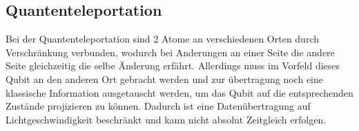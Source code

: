 \subsection{Quantenteleportation}
\label{sec:Quantenteleportation}

Bei der Quantenteleportation sind 2 Atome an verschiedenen Orten durch Verschränkung verbunden, wodurch bei Anderungen an einer Seite die andere Seite gleichzeitig die selbe Änderung erfährt. Allerdings muss im Vorfeld dieses Qubit an den anderen Ort gebracht werden und zur übertragung noch eine klassische Information ausgetauscht werden, um das Qubit auf die entsprechenden Zustände projizieren zu können. Dadurch ist eine Datenübertragung auf Lichtgeschwindigkeit beschränkt und kann nicht absolut Zeitgleich erfolgen.




